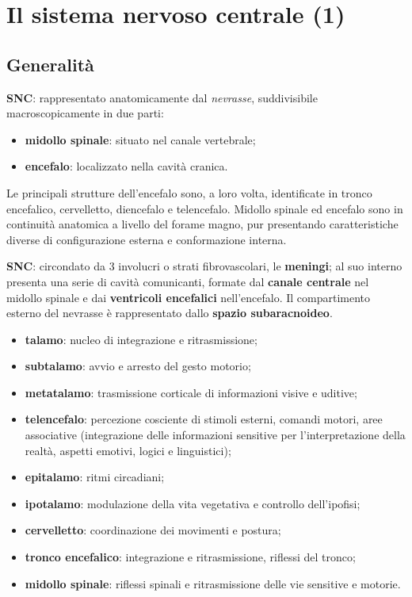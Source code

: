\chapter{Il sistema nervoso centrale (1)}

\section{Generalità}

\textbf{SNC}: rappresentato anatomicamente dal \textit{nevrasse}, suddivisibile
macroscopicamente in due parti:
\begin{itemize}
  \item \textbf{midollo spinale}: situato nel canale vertebrale;
  \item \textbf{encefalo}: localizzato nella cavità cranica.
\end{itemize}

Le principali strutture dell'encefalo sono, a loro volta, identificate in
tronco encefalico, cervelletto, diencefalo e telencefalo. Midollo spinale ed
encefalo sono in continuità anatomica a livello del forame magno, pur
presentando caratteristiche diverse di configurazione esterna e conformazione
interna.

\textbf{SNC}: circondato da 3 involucri o strati fibrovascolari, le
\textbf{meningi}; al suo interno presenta una serie di cavità comunicanti,
formate dal \textbf{canale centrale} nel midollo spinale e dai
\textbf{ventricoli encefalici} nell'encefalo. Il compartimento esterno del
nevrasse è rappresentato dallo \textbf{spazio subaracnoideo}.

\begin{itemize}
  \item \textbf{talamo}: nucleo di integrazione e ritrasmissione;
  \item \textbf{subtalamo}: avvio e arresto del gesto motorio;
  \item \textbf{metatalamo}: trasmissione corticale di informazioni visive e
    uditive;
  \item \textbf{telencefalo}: percezione cosciente di stimoli esterni,
    comandi motori, aree associative (integrazione delle informazioni
    sensitive per l'interpretazione della realtà, aspetti emotivi, logici e
    linguistici);
  \item \textbf{epitalamo}: ritmi circadiani;
  \item \textbf{ipotalamo}: modulazione della vita vegetativa e controllo
    dell'ipofisi;
  \item \textbf{cervelletto}: coordinazione dei movimenti e postura;
  \item \textbf{tronco encefalico}: integrazione e ritrasmissione, riflessi
    del tronco;
  \item \textbf{midollo spinale}: riflessi spinali e ritrasmissione delle
    vie sensitive e motorie.
\end{itemize}

